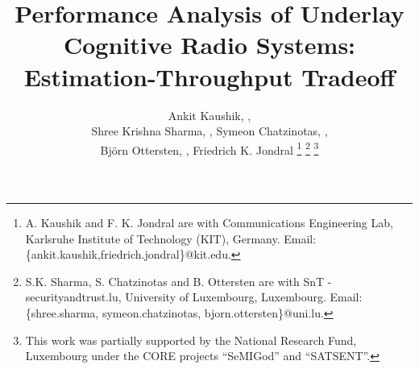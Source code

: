 \documentclass[letterpaper, twocolumn]{IEEEtran}
\begin{document}
%
\title{Performance Analysis of Underlay Cognitive Radio Systems: Estimation-Throughput Tradeoff}
\author{Ankit Kaushik, ,\\ Shree Krishna Sharma,  , Symeon Chatzinotas, ,  \\ Bj\"orn Ottersten, , Friedrich K. Jondral 
\thanks{A. Kaushik and F. K. Jondral are with Communications Engineering Lab, Karlsruhe Institute of Technology (KIT), Germany. Email:{\{ankit.kaushik,friedrich.jondral\}@kit.edu.}}
\thanks{S.K. Sharma, S. Chatzinotas and B. Ottersten are with SnT - securityandtrust.lu, University of Luxembourg, Luxembourg. Email:{\{shree.sharma, symeon.chatzinotas, bjorn.ottersten\}@uni.lu}.}
\thanks{This work was partially supported by the National Research Fund, Luxembourg under the CORE projects ``SeMIGod'' and ``SATSENT''.}
}

\maketitle
\thispagestyle{empty}
\pagestyle{empty}
\end{document}
